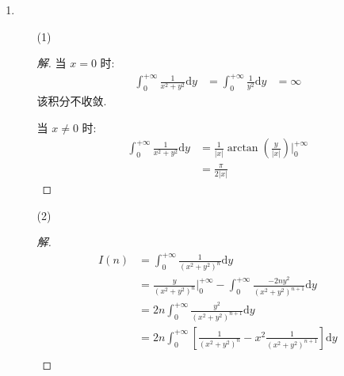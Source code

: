 \documentclass{article}
\begin{document}
\begin{enumerate}
\begin{enumerate}
\begin{proof}
            并且易知 $e^{-y}$ 在 $x\in[0,+\infty)$ 单调并且在 $[0,+\infty)\times[0,+\infty)$ 上一致有界, \par
            根据 Abel 判别法可知, 该含参积分在 $y\in[0,+\infty)$ 上一致收敛.
        \end{proof}
    \end{enumerate}
    \item \begin{enumerate}
        \item[(1)] \begin{proof}[解]
            当 $x=0$ 时: \begin{equation}
                \begin{aligned}
                    \int_{0}^{+\infty}\frac{1}{x^2+y^2}\mathrm{d}y
                    &=\int_{0}^{+\infty}\frac{1}{y^2}\mathrm{d}y
                    &=\infty
                \end{aligned}
                \nonumber
            \end{equation}
            该积分不收敛. \par
            当 $x\neq0$ 时: \begin{equation}
                \begin{aligned}
                    \int_{0}^{+\infty}\frac{1}{x^2+y^2}\mathrm{d}y
                    &=\frac{1}{|x|}\arctan\left(\frac{y}{|x|}\right)\bigg|_{0}^{+\infty} \\
                    &=\frac{\pi}{2|x|}
                \end{aligned}
                \nonumber
            \end{equation}
        \end{proof}
        \item[(2)] \begin{proof}[解]
            \begin{equation}
                \begin{aligned}
                    I(n)
                    &=\int_{0}^{+\infty}\frac{1}{(x^2+y^2)^n}\mathrm{d}y \\
                    &=\frac{y}{(x^2+y^2)^n}\bigg|_{0}^{+\infty}-\int_{0}^{+\infty}\frac{-2ny^2}{(x^2+y^2)^{n+1}}\mathrm{d}y \\
                    &=2n\int_{0}^{+\infty}\frac{y^2}{(x^2+y^2)^{n+1}}\mathrm{d}y \\
                    &=2n\int_{0}^{+\infty}\left[\frac{1}{(x^2+y^2)^{n}}-x^2\frac{1}{(x^2+y^2)^{n+1}}\right]\mathrm{d}y \\
                \end{aligned}

\end{equation}
\end{proof}
\end{enumerate}
\end{enumerate}
\end{document}
